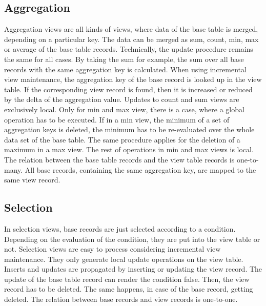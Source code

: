 \documentclass[11pt,a4paper,bibtotoc,idxtotoc,headsepline,footsepline,footexclude,BCOR12mm,DIV13]{scrbook}
\begin{document}
\subsection{Aggregation}
Aggregation views are all kinds of views, where data of the base table is merged, depending on a particular key. The data can be merged as sum, count, min, max or average of the base table records. Technically, the update procedure remains the same for all cases. By taking the sum for example, the sum over all base records with the same aggregation key is calculated. When using incremental view maintenance, the aggregation key of the base record is looked up in the view table. If the corresponding view record is found, then it is increased or reduced by the delta of the aggregation value. Updates to count and sum views are exclusively local. Only for min and max view, there is a case, where a global operation has to be executed. If in a min view, the minimum of a set of aggregation keys is deleted, the minimum has to be re-evaluated over the whole data set of the base table. The same procedure applies for the deletion of a maximum in a max view. The rest of operations in min and max views is local. The relation between the base table records and the view table records is one-to-many. All base records, containing the same aggregation key, are mapped to the same view record.

\subsection{Selection}
In selection views, base records are just selected according to a condition. Depending on the evaluation of the condition, they are put into the view table or not. Selection views are easy to process considering incremental view maintenance. They only generate local update operations on the view table. Inserts and updates are propagated by inserting or updating the view record. The update of the base table record can render the condition false. Then, the view record has to be deleted. The same happens, in case of the base record, getting deleted. The relation between base records and view records is one-to-one. 
\end{document}
